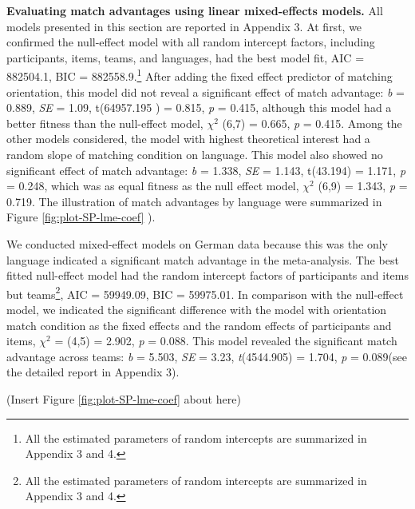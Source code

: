 \documentclass[
  man,floatsintext]{apa6}
\begin{document}
\textbf{Evaluating match advantages using linear mixed-effects models.} All models presented in this section are reported in Appendix 3. At first, we confirmed the null-effect model with all random intercept factors, including participants, items, teams, and languages, had the best model fit, AIC = 882504.1, BIC = 882558.9.\footnote{All the estimated parameters of random intercepts are summarized in Appendix 3 and 4.} After adding the fixed effect predictor of matching orientation, this model did not reveal a significant effect of match advantage: \emph{b} = 0.889, \emph{SE} = 1.09, t(64957.195 ) = 0.815, \emph{p} = 0.415, although this model had a better fitness than the null-effect model, \({\chi}^2\) (6,7) = 0.665, \emph{p} = 0.415. Among the other models considered, the model with highest theoretical interest had a random slope of matching condition on language. This model also showed no significant effect of match advantage: \emph{b} = 1.338, \emph{SE} = 1.143, t(43.194) = 1.171, \emph{p} = 0.248, which was as equal fitness as the null effect model, \({\chi}^2\) (6,9) = 1.343, \emph{p} = 0.719. The illustration of match advantages by language were summarized in Figure \ref{fig:plot-SP-lme-coef} ).

We conducted mixed-effect models on German data because this was the only language indicated a significant match advantage in the meta-analysis. The best fitted null-effect model had the random intercept factors of participants and items but teams\footnote{All the estimated parameters of random intercepts are summarized in Appendix 3 and 4.}, AIC = 59949.09, BIC = 59975.01. In comparison with the null-effect model, we indicated the significant difference with the model with orientation match condition as the fixed effects and the random effects of participants and items, \({\chi}^2\) = (4,5) = 2.902, \emph{p} = 0.088. This model revealed the significant match advantage across teams: \emph{b} = 5.503, \emph{SE} = 3.23, \emph{t}(4544.905) = 1.704, \emph{p} = 0.089(see the detailed report in Appendix 3).

(Insert Figure \ref{fig:plot-SP-lme-coef} about here)
\end{document}
